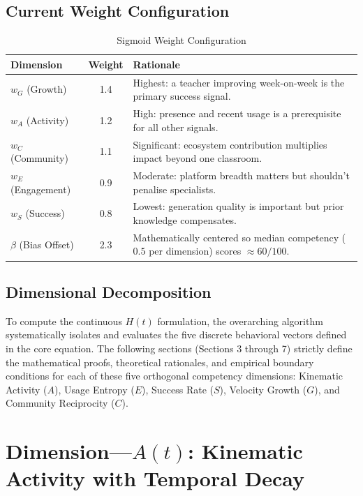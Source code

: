 \documentclass[11pt,a4paper]{article}
\begin{document}
\subsection{Current Weight Configuration}

\begin{table}[H]
    \centering
    \caption{Sigmoid Weight Configuration}
    \begin{tabular}{l c p{10cm}}
        \toprule
        \textbf{Dimension} & \textbf{Weight} & \textbf{Rationale} \\
        \midrule
        $w_G$ (Growth) & 1.4 & Highest: a teacher improving week-on-week is the primary success signal. \\
        $w_A$ (Activity) & 1.2 & High: presence and recent usage is a prerequisite for all other signals. \\
        $w_C$ (Community) & 1.1 & Significant: ecosystem contribution multiplies impact beyond one classroom. \\
        $w_E$ (Engagement) & 0.9 & Moderate: platform breadth matters but shouldn't penalise specialists. \\
        $w_S$ (Success) & 0.8 & Lowest: generation quality is important but prior knowledge compensates. \\
        \midrule
        $\beta$ (Bias Offset) & 2.3 & Mathematically centered so median competency ($0.5$ per dimension) scores $\approx 60/100$. \\
        \bottomrule
    \end{tabular}
\end{table}

\subsection{Dimensional Decomposition}
To compute the continuous $H(t)$ formulation, the overarching algorithm systematically isolates and evaluates the five discrete behavioral vectors defined in the core equation. The following sections (Sections 3 through 7) strictly define the mathematical proofs, theoretical rationales, and empirical boundary conditions for each of these five orthogonal competency dimensions: Kinematic Activity ($A$), Usage Entropy ($E$), Success Rate ($S$), Velocity Growth ($G$), and Community Reciprocity ($C$).

\section{Dimension---$A(t)$: Kinematic Activity with Temporal Decay}
\end{document}
